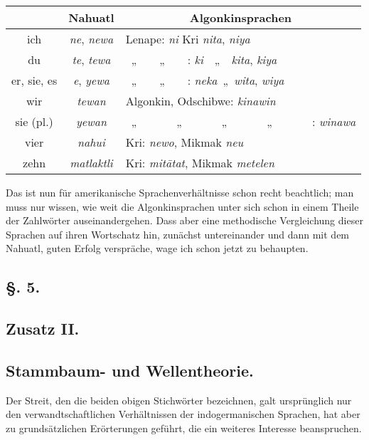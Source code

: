 \label{sp.163}

\begin{table}[h]
\centering
\begin{tabular}{ c || c | l} 
\hline 
\hline
& Nahuatl & \multicolumn{1}{c}{Algonkinsprachen}\\
\hline 
\hline
ich & \textit{ne}, \textit{newa} & Lenape: \textit{ni} Kri \textit{nita}, \textit{niya}\\
du & \textit{te}, \textit{tewa} &~„~~~~„~~~~: \textit{ki}~~„~~\textit{kita}, \textit{kiya}\\
er, sie, es & \textit{e}, \textit{yewa} &~„~~~~„~~~~: \textit{neka}~„~\textit{wita}, \textit{wiya}\\
wir & \textit{tewan} & Algonkin, Odschibwe: \textit{kinawin}\\
sie (pl.) & \textit{yewan} &~„~~~~~~~„~~~~~~~„~~~~~~~„~~~~~~~: \textit{winawa}\\
vier & \textit{nahui} & Kri: \textit{newo}, Mikmak \textit{neu}\\
zehn & \textit{matlaktli} & Kri: \textit{mitātat}, Mikmak \textit{metelen}\\
\end{tabular}
\end{table}

Das ist nun für amerikanische Sprachenverhältnisse schon recht beachtlich; man muss nur wissen, wie weit die Algonkinsprachen unter sich schon in einem Theile der Zahlwörter auseinandergehen. Dass aber eine methodische Vergleichung dieser Sprachen auf ihren Wortschatz hin, zunächst untereinander und dann mit dem Nahuatl, guten Erfolg verspräche, wage ich schon jetzt zu behaupten.

\subsection*{§. 5.}\label{III.I.I.5}
\subsection*{Zusatz II.}
\subsection*{Stammbaum- und Wellentheorie.}
Der Streit, den die beiden obigen Stichwörter bezeichnen, galt ursprünglich nur den verwandtschaftlichen Verhältnissen der indogermanischen Sprachen, hat aber zu grundsätzlichen Erörterungen geführt, die ein weiteres Interesse beanspruchen.
\largerpage[-2]

